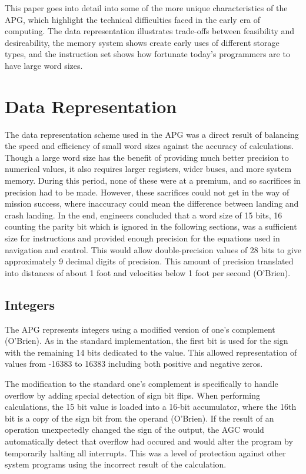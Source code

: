 \documentclass[a4paper,11pt]{article}
\begin{document}
This paper goes into detail into some of the more unique characteristics of the APG, which highlight the technical difficulties faced in the early era of computing.  The data representation illustrates trade-offs between feasibility and desireability, the memory system shows create early uses of different storage types, and the instruction set shows how fortunate today's programmers are to have large word sizes.


\section{Data Representation}
The data representation scheme used in the APG was a direct result of balancing the speed and efficiency of small word sizes against the accuracy of calculations.  Though a large word size has the benefit of providing much better precision to numerical values, it also requires larger registers, wider buses, and more system memory.  During this period, none of these were at a premium, and so sacrifices in precision had to be made.  However, these sacrifices could not get in the way of mission success, where inaccuracy could mean the difference between landing and crash landing.  In the end, engineers concluded that a word size of 15 bits, 16 counting the parity bit which is ignored in the following sections, was a sufficient size for instructions and provided enough precision for the equations used in navigation and control. This would allow double-precision values of 28 bits to give approximately 9 decimal digits of precision.  This amount of precision translated into distances of about 1 foot and velocities below 1 foot per second (O'Brien).  

\subsection{Integers}
The APG represents integers using a modified version of one's complement (O'Brien). As in the standard implementation, the first bit is used for the sign with the remaining 14 bits dedicated to the value.  This allowed representation of values from -16383 to 16383 including both positive and negative zeros. 

The modification to the standard one's complement is specifically to handle overflow by adding special detection of sign bit flips.  When performing calculations, the 15 bit value is loaded into a 16-bit accumulator, where the 16th bit is a copy of the sign bit from the operand (O'Brien).  If the result of an operation unexpectedly changed the sign of the output, the AGC would automatically detect that overflow had occured and would alter the program by temporarily halting all interrupts.  This was a level of protection against other system programs using the incorrect result of the calculation.
\end{document}
